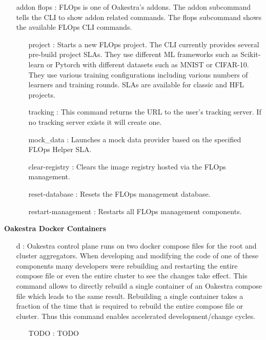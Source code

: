 \begin{itemize}
    \item [addon flops]:
        FLOps is one of Oakestra's addons.
        The addon subcommand tells the CLI to show addon related commands.
        The flops subcommand shows the available FLOps CLI commands.
        \begin{itemize}
            \item [project]:
                Starts a new FLOps project.
                The CLI currently provides several pre-build project SLAs.
                They use different ML frameworks such as Scikit-learn or Pytorch with different datasets such as MNIST or CIFAR-10.
                They use various training configurations including various numbers of learners and training rounds.
                SLAs are available for classic and HFL projects.
            \item [tracking]:
                This command returns the URL to the user's tracking server.
                If no tracking server exists it will create one.
            \item [mock_data]:
                Launches a mock data provider based on the specified FLOps Helper SLA.
            \item [clear-registry]:
                Clears the image registry hosted via the FLOps management.
            \item [reset-database]:
                Resets the FLOps management database.
            \item [restart-management]:
                Restarts all FLOps management components.
        \end{itemize}
\end{itemize}
\vspace{5mm}
\textbf{Oakestra Docker Containers}
\begin{itemize}
    \item [d]:
        Oakestra control plane runs on two docker compose files for the root and cluster aggregators.
        When developing and modifying the code of one of these components many developers were rebuilding and restarting the entire compose file or even the entire cluster to see the changes take effect.
        This command allows to directly rebuild a single container of an Oakestra compose file which leads to the same result.
        Rebuilding a single container takes a fraction of the time that is required to rebuild the entire compose file or cluster.
        Thus this command enables accelerated development/change cycles.
        \begin{itemize}
            \item [TODO]:
                TODO
            
        \end{itemize}
\end{itemize}




